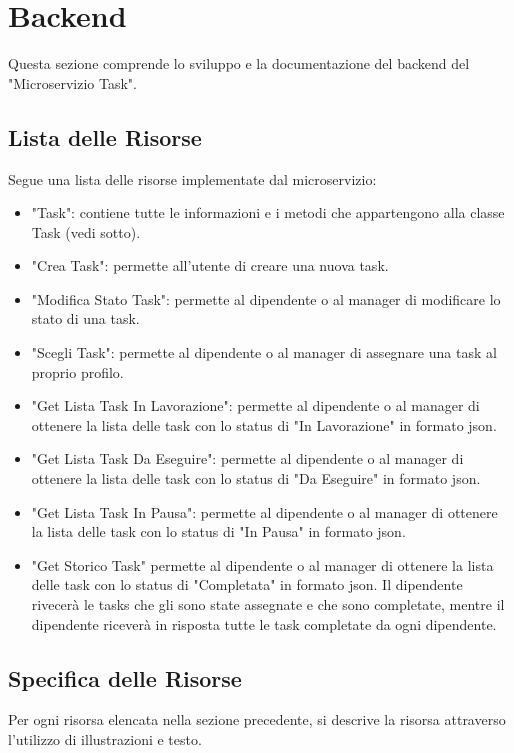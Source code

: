 \documentclass{report}
\begin{document}
\section{Backend}

Questa sezione comprende lo sviluppo e la documentazione del backend del
"Microservizio Task".

\subsection{Lista delle Risorse}

Segue una lista delle risorse implementate dal microservizio:
\begin{itemize}
	\item "Task": contiene tutte le informazioni e i metodi che appartengono alla classe Task (vedi sotto).
	\item "Crea Task": permette all'utente di creare una nuova task.
	\item "Modifica Stato Task": permette al dipendente o al manager di modificare lo stato di una task.
	\item "Scegli Task": permette al dipendente o al manager di assegnare una task al proprio profilo.
	\item "Get Lista Task In Lavorazione": permette al dipendente o al manager di ottenere la lista delle task con lo status di "In Lavorazione" in formato json.
	\item "Get Lista Task Da Eseguire": permette al dipendente o al manager di ottenere la lista delle task con lo status di "Da Eseguire" in formato json.
	\item "Get Lista Task In Pausa": permette al dipendente o al manager di ottenere la lista delle task con lo status di "In Pausa" in formato json.
	\item "Get Storico Task" permette al dipendente o al manager di ottenere la lista delle task con lo status di "Completata" in formato json. Il dipendente rivecerà le tasks che gli sono state assegnate e che sono completate, mentre il dipendente riceverà in risposta tutte le task completate da ogni dipendente.
\end{itemize}

\subsection{Specifica delle Risorse}

Per ogni risorsa elencata nella sezione precedente, si descrive la risorsa attraverso l'utilizzo di illustrazioni e testo.
\end{document}
